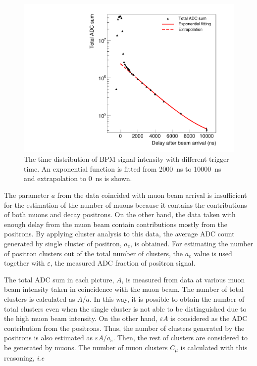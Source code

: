 \documentclass[preprint,3p,twocolumn]{elsarticle}
\begin{document}
\begin{figure}[btp]
	\centering
	\includegraphics[width=\columnwidth]{figure/Decay_v3.pdf}
	\caption{The time distribution of BPM signal intensity
          with different trigger time. An exponential function is
          fitted from \SI{2000}{\ns} to \SI{10000}{\ns} and
          extrapolation to \SI{0}{\ns} is shown.}
	\label{fig:time_distribution}
\end{figure}

The parameter $a$ from the data coincided with muon beam arrival
is insufficient for the estimation of the number of muons because
it contains the contributions of both muons and decay
positrons. On the other hand, the data taken with enough delay
from the muon beam contain contributions mostly from the
positrons. By applying cluster analysis to this data, the average
ADC count generated by single cluster of positron, $a_e$, is
obtained. For estimating the number of positron clusters out of
the total number of clusters, the $a_e$ value is used together
with $\varepsilon$, the measured ADC fraction of positron signal.

The total ADC sum in each picture, $A$, is measured from data at
various muon beam intensity taken in coincidence with the muon
beam.  The number of total clusters is calculated as $A/a$. In
this way, it is possible to obtain the number of total clusters
even when the single cluster is not able to be distinguished due
to the high muon beam intensity.  On the other hand,
$\varepsilon A$ is considered as the ADC contribution from the
positrons. Thus, the number of clusters generated by the
positrons is also estimated as $\varepsilon A/a_e$. Then, the
rest of clusters are considered to be generated by muons. The
number of muon clusters $C_{\mu}$ is calculated with this
reasoning, {\it i.e}
\end{document}
